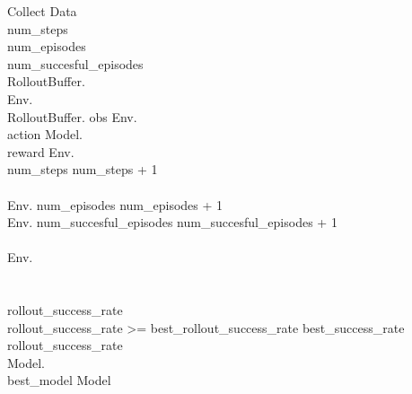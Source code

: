 \renewcommand{\thepseudonum}{\roman{pseudonum}}
\begin{pseudocode}{Collect Data}{ }
    \\

    num\_steps \\
    num\_episodes \\
    num\_succesful\_episodes \\

    RolloutBuffer.\\
    Env.\\
    \WHILE RolloutBuffer. \DO
    \BEGIN
    obs \GETS Env.\\
    action \GETS Model.\\
    reward \GETS Env.\\
    num\_steps \GETS num\_steps + 1\\
    \\
    \IF Env. \THEN
    \BEGIN
    num\_episodes \GETS num\_episodes + 1\\
    \IF Env. \THEN
    \BEGIN
    num\_succesful\_episodes \GETS num\_succesful\_episodes + 1\\
    \END\\
    Env.\\
    \END\\
    \END\\

    rollout\_success\_rate \GETS {}\\

    \IF rollout\_success\_rate >= best\_rollout\_success\_rate \THEN
    \BEGIN
    best\_success\_rate \GETS rollout\_success\_rate\\
    Model.\\
    best\_model \GETS Model\\
    \END\\


    \ENDPROCEDURE
    \label{pseudocode:collect_data}
\end{pseudocode}

